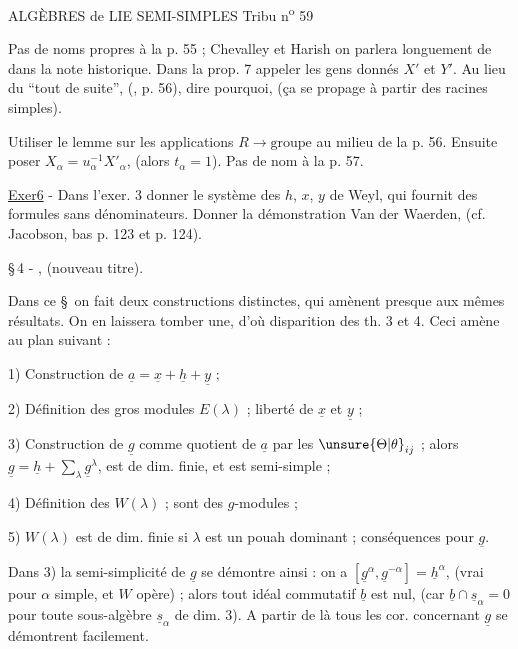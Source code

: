 ALGÈBRES de LIE SEMI-SIMPLES \hfill Tribu n\textsuperscript{o} 59

Pas de noms propres à la p. 55 ; Chevalley et Harish on parlera longuement de dans la note historique. Dans la prop. 7 appeler les gens donnés $X'$ et $Y'$. Au lieu du ``tout de suite'', (, p. 56), dire pourquoi, (ça se propage à partir des racines simples).

Utiliser le lemme sur les applications $R\longrightarrow\text{groupe}$ au milieu de la p. 56. Ensuite poser $X_\alpha=u_\alpha^{-1}X'_\alpha$, (alors $t_\alpha=1$). Pas de nom à la p. 57.

\uline{Exer6} - Dans l'exer. 3 donner le système des $h$, $x$, $y$ de Weyl, qui fournit des formules sans dénominateurs. Donner la démonstration Van der Waerden, (cf. Jacobson, bas p. 123 et p. 124).

\S\,4 - , (nouveau titre).

Dans ce \S\ on fait deux constructions distinctes, qui amènent presque aux mêmes résultats. On en laissera tomber une, d'où disparition des th. 3 et 4. Ceci amène au plan suivant :

1) Construction de $\underline{a}=\underline{x}+\underline{h}+\underline{y}$ ;

2) Définition des gros modules $E(\lambda)$ ; liberté de $\underline{x}$ et $\underline{y}$ ;

3) Construction de $\underline{g}$ comme quotient de $\underline{a}$ par les $\unsure{\Theta|\theta}_{ij}$ ; alors $\underline{g}=\underline{h}+\sum_{\lambda}\underline{g}^{\lambda}$, est de dim. finie, et est semi-simple ;

4) Définition des $W(\lambda)$ ; sont des $g$-modules ;

5) $W(\lambda)$ est de dim. finie si $\lambda$ est un pouah dominant ; conséquences pour $\underline{g}$.

Dans 3) la semi-simplicité de $\underline{g}$ se démontre ainsi : on a $[\underline{g}^{\alpha},\underline{g}^{-\alpha}]=\underline{h}^{\alpha}$, (vrai pour $\alpha$ simple, et $W$ opère) ; alors tout idéal commutatif $\underline{b}$ est nul, (car $\underline{b}\cap\underline{s}_\alpha=0$ pour toute sous-algèbre $\underline{s}_\alpha$ de dim. 3). A partir de là tous les cor. concernant $\underline{g}$ se démontrent facilement.
